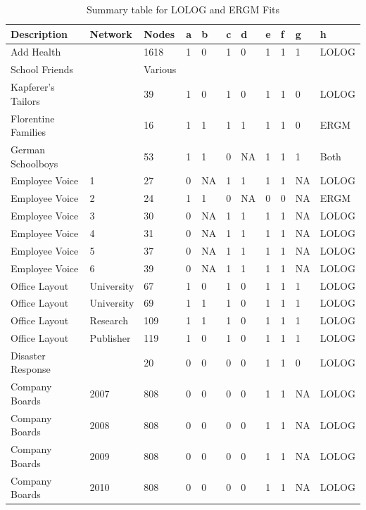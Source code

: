 \documentclass[
]{statsoc}
\begin{document}
\begin{longtable}[t]{lllllllllll}
\caption{\label{tab:unnamed-chunk-8}\label{tab:summary_table} Summary table for LOLOG and ERGM Fits}\\
\toprule
Description & Network & Nodes & a & b & c & d & e & f & g & h\\
\midrule
\rowcolor{gray!6}  Add Health &  & 1618 & 1 & 0 & 1 & 0 & 1 & 1 & 1 & LOLOG\\
School Friends &  & Various &  &  &  &  &  &  &  & \\
\rowcolor{gray!6}  Kapferer's Tailors &  & 39 & 1 & 0 & 1 & 0 & 1 & 1 & 0 & LOLOG\\
Florentine Families &  & 16 & 1 & 1 & 1 & 1 & 1 & 1 & 0 & ERGM\\
\rowcolor{gray!6}  German Schoolboys &  & 53 & 1 & 1 & 0 & NA & 1 & 1 & 1 & Both\\
\addlinespace
Employee Voice & 1 & 27 & 0 & NA & 1 & 1 & 1 & 1 & NA & LOLOG\\
\rowcolor{gray!6}  Employee Voice & 2 & 24 & 1 & 1 & 0 & NA & 0 & 0 & NA & ERGM\\
Employee Voice & 3 & 30 & 0 & NA & 1 & 1 & 1 & 1 & NA & LOLOG\\
\rowcolor{gray!6}  Employee Voice & 4 & 31 & 0 & NA & 1 & 1 & 1 & 1 & NA & LOLOG\\
Employee Voice & 5 & 37 & 0 & NA & 1 & 1 & 1 & 1 & NA & LOLOG\\
\addlinespace
\rowcolor{gray!6}  Employee Voice & 6 & 39 & 0 & NA & 1 & 1 & 1 & 1 & NA & LOLOG\\
Office Layout & University & 67 & 1 & 0 & 1 & 0 & 1 & 1 & 1 & LOLOG\\
\rowcolor{gray!6}  Office Layout & University & 69 & 1 & 1 & 1 & 0 & 1 & 1 & 1 & LOLOG\\
Office Layout & Research & 109 & 1 & 1 & 1 & 0 & 1 & 1 & 1 & LOLOG\\
\rowcolor{gray!6}  Office Layout & Publisher & 119 & 1 & 0 & 1 & 0 & 1 & 1 & 1 & LOLOG\\
\addlinespace
Disaster Response &  & 20 & 0 & 0 & 0 & 0 & 1 & 1 & 0 & LOLOG\\
\rowcolor{gray!6}  Company Boards & 2007 & 808 & 0 & 0 & 0 & 0 & 1 & 1 & NA & LOLOG\\
Company Boards & 2008 & 808 & 0 & 0 & 0 & 0 & 1 & 1 & NA & LOLOG\\
\rowcolor{gray!6}  Company Boards & 2009 & 808 & 0 & 0 & 0 & 0 & 1 & 1 & NA & LOLOG\\
Company Boards & 2010 & 808 & 0 & 0 & 0 & 0 & 1 & 1 & NA & LOLOG\\

\end{longtable}
\end{document}
